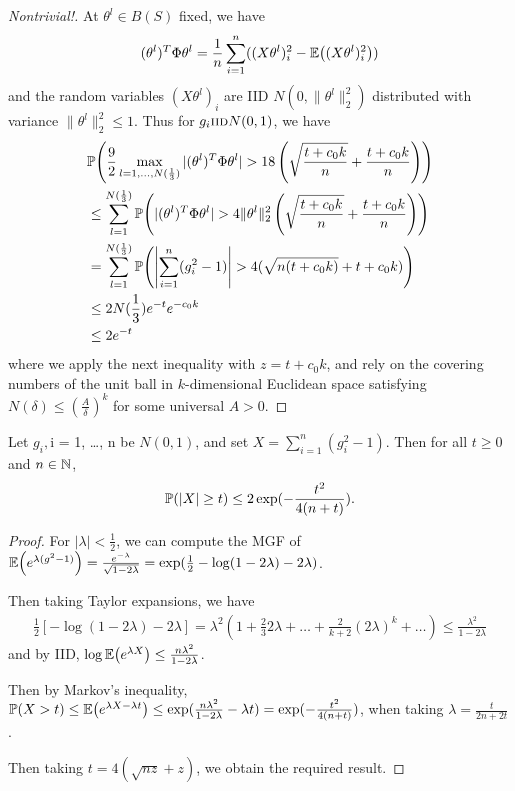 \begin{proof}[Nontrivial!]
  At $\theta^{l} \in B(S)$ fixed, we have
  \begin{align}
    \label{eq:77}
    (\theta^{l})^{T} \Phi \theta^{l} = \frac{1}{n} \sum_{i=1}^{n} ((X
    \theta^{l})_{i}^{2} - \E{(X \theta^{l})_{i}^{2}})
  \end{align} and the random variables $(X \theta^{l})_{i}$ are IID
  $N(0, \| \theta^{l}\|_{2}^{2})$ distributed with variance $\|
  \theta^{l} \|_{2}^{2} \leq 1$.  Thus for $g_{i} \textsc{iid} N(0, 1)$, we
  have
  \begin{align}
    \label{eq:78}
    &\Prob{\frac{9}{2} \max_{l = 1, \dots, N(\frac{1}{3})} |
      (\theta^{l})^{T} \Phi \theta^{l} | > 18 \left(\sqrt{\frac{t +
            c_{0} k}{n}} + \frac{t + c_{0} k}{n} \right)} \\
    &\leq \sum_{l=1}^{N(\frac{1}{3})} \Prob{|(\theta^{l})^{T} \Phi
      \theta^{l}| > 4 \| \theta^{l} \|_{2}^{2} \left( \sqrt{\frac{t +
            c_{0} k}{n}} + \frac{t + c_{0} k}{n} \right)} \\
    &= \sum_{l=1}^{N(\frac{1}{3})}  \Prob{\left|\sum_{i=1}^{n} (g_{i}^{2} -
        1) \right| > 4 (\sqrt{n(t+ c_{0}k)} + t + c_{0}k)} \\
    &\leq 2N(\frac{1}{3} )e^{-t} e^{-c_{0} k} \\
    &\leq 2e^{-t}
  \end{align} where we apply the next inequality with $z = t +
  c_{0}k$, and rely on the covering numbers of the unit ball in
  $k$-dimensional Euclidean space satisfying $N(\delta) \leq
  \left(\frac{A}{\delta}\right)^{k}$ for some universal $A > 0$.
\end{proof}

\begin{thm}
  Let $g_{i}, $i = 1, \dots, n be \iid $N(0, 1)$, and set $X =
  \sum_{i=1}^{n} (g_{i}^{2} - 1)$.  Then for all $t \geq 0$ and $n \in
  \mathbb{N}$,
  \begin{equation}
    \label{eq:40}
    \Prob{|X| \geq t} \leq 2 \exp(-\frac{t^{2}}{4(n+t)}).
  \end{equation}
\end{thm}

\begin{proof}
  For $| \lambda | < \frac{1}{2}$, we can compute the MGF of
  $\E{e^{\lambda(g^{2} - 1)}} = \frac{e^{-\lambda}}{\sqrt{1 -
      2\lambda}} = \exp(\frac{1}{2} -\log(1 - 2 \lambda) - 2
  \lambda)$.

  Then taking Taylor expansions, we have
  \begin{align}
    \label{eq:66}
    \frac{1}{2} [- \log (1 - 2 \lambda) - 2 \lambda] = \lambda^{2} (1
    + \frac{2}{3} 2 \lambda + \dots + \frac{2}{k+2}(2\lambda)^{k} +
    \dots) \leq \frac{\lambda^{2}}{1 - 2 \lambda}
  \end{align} and by IID, $\log \E{e^{\lambda X}} \leq \frac{n
    \lambda^{2}}{1 - 2 \lambda} $.

  Then by Markov's inequality, $\Prob{X > t} \leq \E{e^{\lambda X -
      \lambda t}} \leq \exp(\frac{n\lambda^{2}}{1-2\lambda} - \lambda
  t) = \exp(-\frac{t^{2}}{4(n+t)})$, when taking $\lambda =
  \frac{t}{2n + 2t}$.

  Then taking $t = 4(\sqrt{nz} + z)$, we obtain the required result.
\end{proof}



